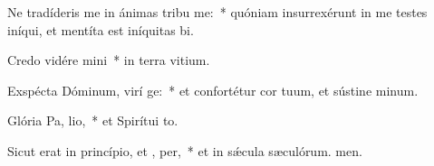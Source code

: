 \item Ne tradíderis me in ánimas tribu me:~* quóniam insurrexérunt in me testes iníqui, et mentíta est iníquitas bi.
\item Credo vidére  mini~* in terra vitium.
\item Exspécta Dóminum, virí ge:~* et confortétur cor tuum, et sústine minum.
\item Glória Pa,  lio,~* et Spirítui to.
\item Sicut erat in princípio, et ,  per,~* et in sǽcula sæculórum. men.
